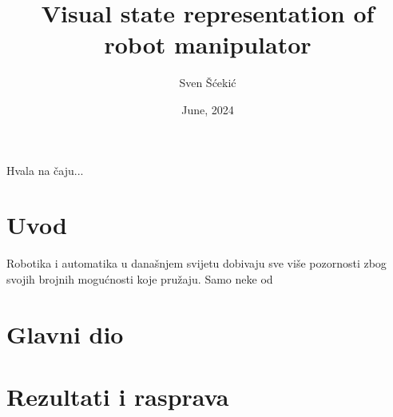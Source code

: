 \documentclass[times, utf8, diplomskirad]{fer}
\title{Visual state representation of robot manipulator}
\author{Sven Šćekić}
\date{June, 2024}
\begin{document}
\maketitle






\begin{zahvale}
  Hvala na čaju...
\end{zahvale}


\mainmatter


\tableofcontents


\chapter{Uvod}
\label{pog:uvod}

Robotika i automatika u današnjem svijetu dobivaju sve više pozornosti zbog svojih brojnih mogućnosti koje pružaju.
Samo neke od

\chapter{Glavni dio}
\label{pog:glavni_dio}

\Blindtext


\chapter{Rezultati i rasprava}
\label{pog:rezultati_i_rasprava}

\Blindtext


\end{document}
